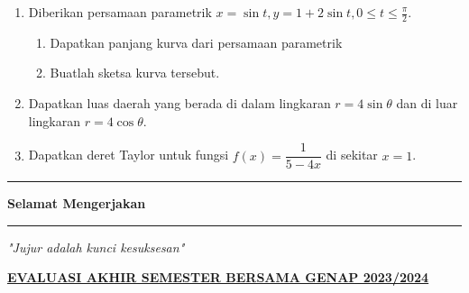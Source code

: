 \documentclass[10pt,openany,a4paper]{article}
\theoremstyle{definition}
\theoremstyle{definition}
\theoremstyle{plain}
\begin{document}
\begin{enumerate}
\begin{center}
\end{center}
    \item Diberikan persamaan parametrik $x=\sin t, y=1+2\sin t, 0\leq t\leq \frac{\pi}{2}$.
    \begin{enumerate}
        \item Dapatkan panjang kurva dari persamaan parametrik
        \item Buatlah sketsa kurva tersebut.
    \end{enumerate}
    \item Dapatkan luas daerah yang berada di dalam lingkaran $r=4\sin\theta$ dan di luar lingkaran  $r=4\cos\theta$.
    \item Dapatkan deret Taylor untuk fungsi $f(x)=\dfrac{1}{5-4x}$ di sekitar $x=1$.
\end{enumerate}
\vfill
\begin{center}
    \noindent\rule{0.366416\linewidth}{2pt} \textbf{ Selamat Mengerjakan } \rule{0.366416\linewidth}{2pt}
\end{center}
\begin{center}
    \textit{"Jujur adalah kunci kesuksesan"}
\end{center}

\newpage
\begin{center}
	{\underline{\textbf{\MakeUppercase{EVALUASI AKHIR SEMESTER BERSAMA GENAP 2023/2024}}}}
    \end{center}
\end{document}
